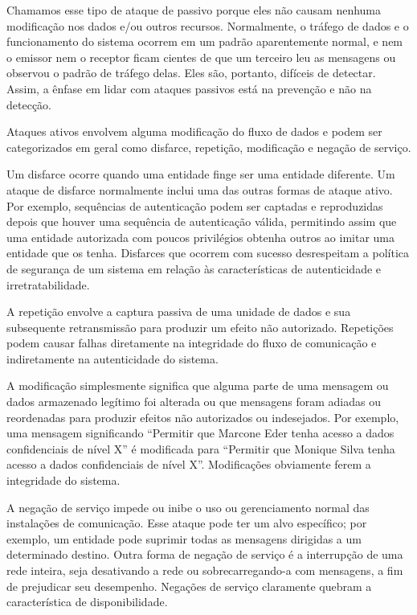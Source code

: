 \documentclass[
	10pt,				%
	openright,			%
	twoside,			%
	a5paper,			%
	english,			%
	french,				%
	spanish,			%
	brazil,				%
	sumario=tradicional
]{abntex2}
\begin{document}
Chamamos esse tipo de ataque de passivo porque eles não causam nenhuma modificação nos dados e/ou outros recursos. Normalmente, o tráfego de dados e o funcionamento do sistema ocorrem em um padrão aparentemente normal, e nem o emissor nem o receptor ficam cientes de que um terceiro leu as mensagens ou observou o padrão de tráfego delas. Eles são, portanto, difíceis de detectar. Assim, a ênfase em lidar com ataques passivos está na prevenção e não na detecção.	

Ataques ativos envolvem alguma modificação do fluxo de dados e podem ser categorizados em geral como disfarce, repetição, modificação e negação de serviço.

Um disfarce ocorre quando uma entidade finge ser uma entidade diferente. Um ataque de disfarce normalmente inclui uma das outras formas de ataque ativo. Por exemplo, sequências de autenticação podem ser captadas e reproduzidas depois que houver uma sequência de autenticação válida, permitindo assim que uma entidade autorizada com poucos privilégios obtenha outros ao imitar uma entidade que os tenha. Disfarces que ocorrem com sucesso desrespeitam a política de segurança de um sistema em relação às características de autenticidade e irretratabilidade.

A repetição envolve a captura passiva de uma unidade de dados e sua subsequente retransmissão para produzir um efeito não autorizado. Repetições podem causar falhas diretamente na integridade do fluxo de comunicação e indiretamente na autenticidade do sistema.

A modificação simplesmente significa que alguma parte de uma mensagem ou dados armazenado legítimo foi alterada ou que mensagens foram adiadas ou reordenadas para produzir efeitos não autorizados ou indesejados. Por exemplo, uma mensagem significando “Permitir que Marcone Eder tenha acesso a dados confidenciais de nível X” é modificada para “Permitir que Monique Silva tenha acesso a dados confidenciais de nível X”. Modificações obviamente ferem a integridade do sistema.

A negação de serviço impede ou inibe o uso ou gerenciamento normal das instalações de comunicação. Esse ataque pode ter um alvo específico; por exemplo, um entidade pode suprimir todas as mensagens dirigidas a um determinado destino. Outra forma de negação de serviço é a interrupção de uma rede inteira, seja desativando a rede ou sobrecarregando-a com mensagens, a fim de prejudicar seu desempenho. Negações de serviço claramente quebram a característica de disponibilidade.
\end{document}

